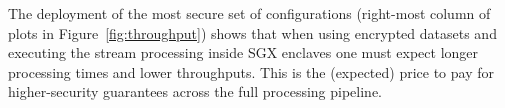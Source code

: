 The deployment of the most secure set of configurations (right-most column of plots in Figure~\ref{fig:throughput}) shows that when using encrypted datasets and executing the stream processing inside SGX enclaves one must expect longer processing times and lower throughputs.
This is the (expected) price to pay for higher-security guarantees across the full processing pipeline.





